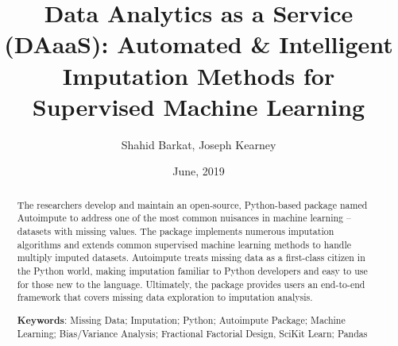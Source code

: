 \documentclass[12pt,oneside]{chicagocapstone}
\title{Data Analytics as a Service (DAaaS): Automated \& Intelligent Imputation
Methods for Supervised Machine Learning}
\author{Shahid Barkat, Joseph Kearney}
\date{June, 2019} %
\begin{document}
  \maketitle

\frontmatter %
\pagestyle{empty} %


  \begin{abstract}
    The researchers develop and maintain an open-source, Python-based
    package named Autoimpute to address one of the most common nuisances in
    machine learning -- datasets with missing values. The package implements
    numerous imputation algorithms and extends common supervised machine
    learning methods to handle multiply imputed datasets. Autoimpute treats
    missing data as a first-class citizen in the Python world, making
    imputation familiar to Python developers and easy to use for those new
    to the language. Ultimately, the package provides users an end-to-end
    framework that covers missing data exploration to imputation analysis.
    
    \bigskip  \bigskip
    \bigskip
    
    \textbf{Keywords}: Missing Data; Imputation; Python; Autoimpute Package;
    Machine Learning; Bias/Variance Analysis; Fractional Factorial Design,
    SciKit Learn; Pandas
  \end{abstract}
\end{document}
